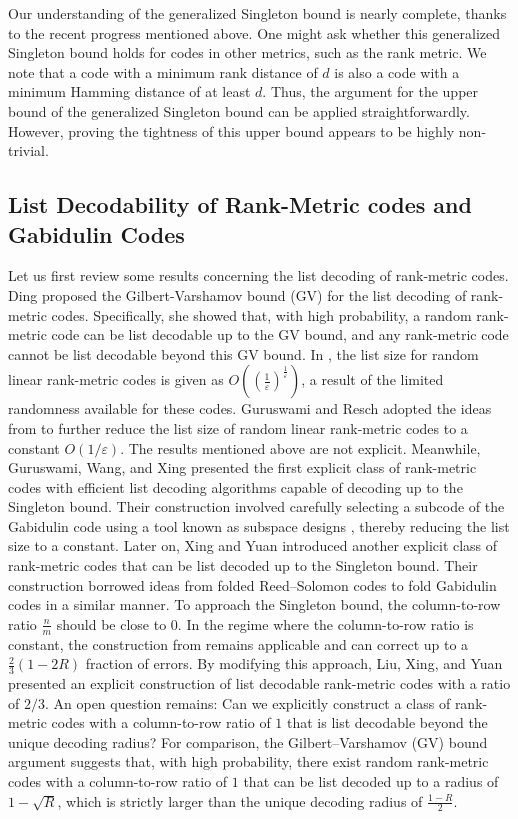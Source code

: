\documentclass[11pt]{article}
\theoremstyle{plain}
\theoremstyle{definition}
\theoremstyle{remark}
\renewcommand{\epsilon}{\varepsilon}
\begin{document}
Our understanding of the generalized Singleton bound is nearly complete, thanks to the recent progress mentioned above. One might ask whether this generalized Singleton bound holds for codes in other metrics, such as the rank metric. We note that a code with a minimum rank distance of $d$ is also a code with a minimum Hamming distance of at least $d$. Thus, the argument for the upper bound of the generalized Singleton bound can be applied straightforwardly. However, proving the tightness of this upper bound appears to be highly non-trivial.



\subsection{List Decodability of Rank-Metric codes and Gabidulin Codes}
Let us first review some results concerning the list decoding of rank-metric codes. Ding \cite{ding2014list} proposed the Gilbert-Varshamov bound (GV) for the list decoding of rank-metric codes. Specifically, she showed that, with high probability, a random rank-metric code can be list decodable up to the GV bound, and any rank-metric code cannot be list decodable beyond this GV bound. In \cite{ding2014list}, the list size for random linear rank-metric codes is given as $O\left((\frac{1}{\epsilon})^{\frac{1}{\epsilon}}\right)$, a result of the limited randomness available for these codes.
Guruswami and Resch \cite{GR18} adopted the ideas from \cite{GHK10} to further reduce the list size of random linear rank-metric codes to a constant $O(1/\epsilon)$.
The results mentioned above are not explicit.
Meanwhile, Guruswami, Wang, and Xing \cite{GWX16} presented the first explicit class of rank-metric codes with efficient list decoding algorithms capable of decoding up to the Singleton bound. Their construction involved carefully selecting a subcode of the Gabidulin code using a tool known as subspace designs \cite{GK13}, thereby reducing the list size to a constant. Later on, Xing and Yuan \cite{XY18} introduced another explicit class of rank-metric codes that can be list decoded up to the Singleton bound. Their construction borrowed ideas from folded Reed--Solomon codes to fold Gabidulin codes in a similar manner. To approach the Singleton bound, the column-to-row ratio $\frac{n}{m}$ should be close to $0$. In the regime where the column-to-row ratio is constant, the construction from \cite{XY18} remains applicable and can correct up to a $\frac{2}{3}(1-2R)$ fraction of errors. By modifying this approach, Liu, Xing, and Yuan \cite{LYX23} presented an explicit construction of list decodable rank-metric codes with a ratio of $2/3$. An open question remains: Can we explicitly construct a class of rank-metric codes with a column-to-row ratio of $1$ that is list decodable beyond the unique decoding radius? For comparison, the Gilbert--Varshamov (GV) bound argument suggests that, with high probability, there exist random rank-metric codes with a column-to-row ratio of $1$ that can be list decoded up to a radius of $1-\sqrt{R}$, which is strictly larger than the unique decoding radius of $\frac{1-R}{2}$.
\end{document}
